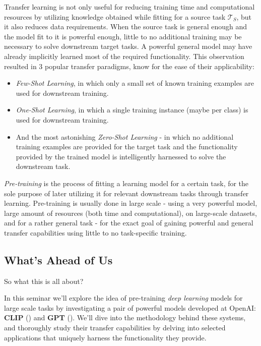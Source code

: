 \documentclass{article}
\begin{document}
\medskip
\noindent
Transfer learning is not only useful for reducing training time and computational resources by utilizing knowledge obtained while fitting for a source task $\mathcal{T}_S$, but it also reduces data requirements. When the source task is general enough and the model fit to it is powerful enough, little to no additional training may be necessary to solve downstream target tasks. A powerful general model may have already implicitly learned most of the required functionality. This observation resulted in 3 popular transfer paradigms, know for the ease of their applicability:
\begin{itemize}
    \item \emph{Few-Shot Learning},
        in which only a small set of known training examples are used for downstream training.
    \item \emph{One-Shot Learning},
        in which a single training instance (maybe per class) is used for downstream training.
    \item And the most astonishing \emph{Zero-Shot Learning} -
        in which no additional training examples are provided for the target task and the functionality provided by the trained model is intelligently harnessed to solve the downstream task.
\end{itemize}

\medskip
\noindent
\emph{Pre-training} is the process of fitting a learning model for a certain task, for the sole purpose of later utilizing it for relevant downstream tasks through transfer learning. Pre-training is usually done in large scale - using a very powerful model, large amount of resources (both time and computational), on large-scale datasets, and for a rather general task - for the exact goal of gaining powerful and general transfer capabilities using little to no task-specific training.



\subsection{What's Ahead of Us}
\label{sec:the-seminar}

So what this is all about?

\medskip
\noindent
In this seminar we'll explore the idea of pre-training \emph{deep learning} models for large scale tasks by investigating a pair of powerful models developed at OpenAI: \textbf{CLIP} (\citet{radford2021clip}) and \textbf{GPT} (\citet{radford2018gpt1, radford2019gpt2, brown2020gpt3}). We'll dive into the methodology behind these systems, and thoroughly study their transfer capabilities by delving into selected applications that uniquely harness the functionality they provide.
\end{document}

